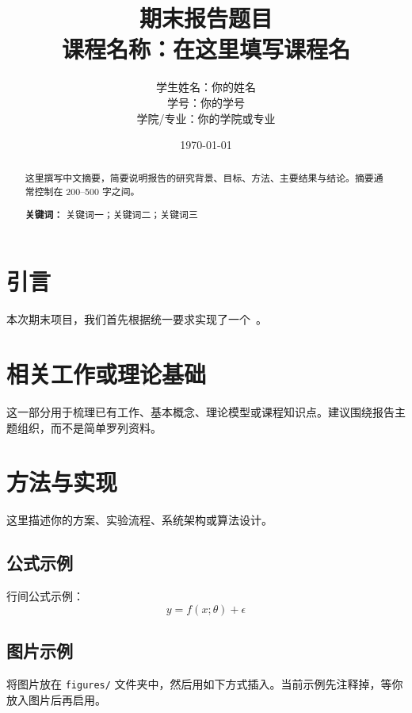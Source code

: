 \documentclass[UTF8,fontset=none,zihao=-4,a4paper]{ctexart}
\title{
  \vspace{1.5cm}
  {\bfseries\zihao{2} 期末报告题目}\\[0.8em]
  {\large 课程名称：在这里填写课程名}
}
\author{
  学生姓名：你的姓名\\
  学号：你的学号\\
  学院/专业：你的学院或专业
}
\date{\today}
\begin{document}
\maketitle
\thispagestyle{empty}

\begin{abstract}
这里撰写中文摘要，简要说明报告的研究背景、目标、方法、主要结果与结论。摘要通常控制在 200--500 字之间。

\noindent\textbf{关键词：} 关键词一；关键词二；关键词三
\end{abstract}

\newpage
\tableofcontents
\newpage

\section{引言}

本次期末项目，我们首先根据统一要求实现了一个~\cite{ctex}。

\section{相关工作或理论基础}

这一部分用于梳理已有工作、基本概念、理论模型或课程知识点。建议围绕报告主题组织，而不是简单罗列资料。

\section{方法与实现}

这里描述你的方案、实验流程、系统架构或算法设计。

\subsection{公式示例}

行间公式示例：
\begin{equation}
  y = f(x;\theta) + \epsilon
\end{equation}

\subsection{图片示例}

将图片放在 \texttt{figures/} 文件夹中，然后用如下方式插入。当前示例先注释掉，等你放入图片后再启用。

\end{document}
